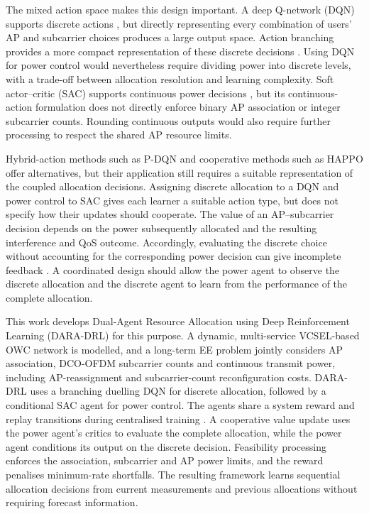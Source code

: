 \documentclass[journal]{IEEEtran}
\begin{document}
The mixed action space makes this design important. A deep Q-network (DQN) supports discrete actions \cite{Mnih2015DQN}, but directly representing every combination of users' AP and subcarrier choices produces a large output space. Action branching provides a more compact representation of these discrete decisions \cite{Tavakoli2018Branching}. Using DQN for power control would nevertheless require dividing power into discrete levels, with a trade-off between allocation resolution and learning complexity. Soft actor--critic (SAC) supports continuous power decisions \cite{Haarnoja2018SAC}, but its continuous-action formulation does not directly enforce binary AP association or integer subcarrier counts. Rounding continuous outputs would also require further processing to respect the shared AP resource limits.

Hybrid-action methods such as P-DQN \cite{Xiong2018PDQN} and cooperative methods such as HAPPO \cite{Kuba2022HAPPO} offer alternatives, but their application still requires a suitable representation of the coupled allocation decisions. Assigning discrete allocation to a DQN and power control to SAC gives each learner a suitable action type, but does not specify how their updates should cooperate. The value of an AP--subcarrier decision depends on the power subsequently allocated and the resulting interference and QoS outcome. Accordingly, evaluating the discrete choice without accounting for the corresponding power decision can give incomplete feedback \cite{11370966}. A coordinated design should allow the power agent to observe the discrete allocation and the discrete agent to learn from the performance of the complete allocation.

This work develops Dual-Agent Resource Allocation using Deep Reinforcement Learning (DARA-DRL) for this purpose. A dynamic, multi-service VCSEL-based OWC network is modelled, and a long-term EE problem jointly considers AP association, DCO-OFDM subcarrier counts and continuous transmit power, including AP-reassignment and subcarrier-count reconfiguration costs. DARA-DRL uses a branching duelling DQN for discrete allocation, followed by a conditional SAC agent for power control. The agents share a system reward and replay transitions during centralised training \cite{Lowe2017MADDPG}. A cooperative value update uses the power agent's critics to evaluate the complete allocation, while the power agent conditions its output on the discrete decision. Feasibility processing enforces the association, subcarrier and AP power limits, and the reward penalises minimum-rate shortfalls. The resulting framework learns sequential allocation decisions from current measurements and previous allocations without requiring forecast information.
\end{document}
